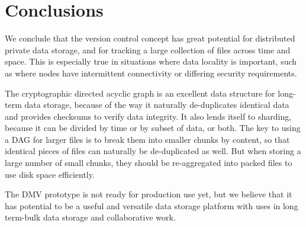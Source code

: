 \section{Conclusions}

We conclude that the version control concept has great potential for distributed
private data storage, and for tracking a large collection of files across time
and space. This is especially true in situations where data locality is
important, such as where nodes have intermittent connectivity or differing
security requirements.

The cryptographic directed acyclic graph is an excellent data structure for
long-term data storage, because of the way it naturally de-duplicates identical
data and provides checksums to verify data integrity. It also lends itself to
sharding, because it can be divided by time or by subset of data, or both. The
key to using a \gls{DAG} for larger files is to break them into smaller chunks
by content, so that identical pieces of files can naturally be de-duplicated as
well. But when storing a large number of small chunks, they should be
re-aggregated into packed files to use disk space efficiently.

The \gls{DMV} prototype is not ready for production use yet, but we believe that
it has potential to be a useful and versatile data storage platform with uses in
long term-bulk data storage and collaborative work.
